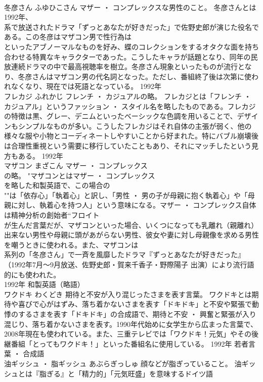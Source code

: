 \documentclass[8pt]{extreport}
\begin{document}
\begin{CJK}{UTF8}{min}
\\	冬彦さん	ふゆひこさん	マザー ・ コンプレックスな男性のこと。	冬彦さんとは1992年、
\\	系で放送されたドラマ「ずっとあなたが好きだった」で佐野史郎が演じた役名である。この冬彦はマザコン男で性行為は
\\	といったアブノーマルなものを好み、蝶のコレクションをするオタクな面を持ち合わせる特異なキャラクターであった。こうしたキャラが話題となり、同年の民放連続ドラマの中で最高視聴率を樹立。冬彦さん現象といったものが流行となり、冬彦さんはマザコン男の代名詞となった。ただし、番組終了後は次第に使われなくなり、現在では死語となっている。	1992年	
\\	フレカジ	ふれかじ	フレンチ ・ カジュアルの略。	フレカジとは「フレンチ ・ カジュアル」というファッション ・ スタイル名を略したものである。フレカジの特徴は黒、グレー、デニムといったベーシックな色調を用いることで、デザインもシンプルなものが多い。こうしたフレカジはそれ自体の主張が弱く、他の様々な服や小物とコーディネートしやすいことから好まれた。特にバブル崩壊後は合理性重視という需要に移行していたこともあり、それにマッチしたという見方もある。	1992年	
\\	マザコン	まざこん	マザー ・ コンプレックス
\\	の略。	"マザコンとはマザー ・ コンプレックス
\\	を略した和製英語で、この場合の
\\	""は「依存心」「執着心」と訳し、「男性 ・ 男の子が母親に抱く執着心」や「母親に対し、執着心を持つ人」という意味になる。マザー ・ コンプレックス自体は精神分析の創始者“フロイト
\\	が生んだ言葉だが、マザコンといった場合、いくつになっても乳離れ（親離れ）出来ない男性や母親に頭があがらない男性、彼女や妻に対し母親像を求める男性を嘲うときに使われる。また、マザコンは
\\	系列の「冬彦さん」で一斉を風靡したドラマ『ずっとあなたが好きだった』（1992年7月～9月放送、佐野史郎・賀来千香子・野際陽子 出演）により流行語的にも使われた。
\\	1992年	和製英語（略語）	
\\	ワクドキ	わくどき	期待と不安が入り混じったさまを表す言葉。	ワクドキとは期待や喜びで心がはずみ、落ち着かないさまを表す「ドキドキ」と不安や緊張で動悸のするさまを表す「ドキドキ」の合成語で、期待と不安 ・ 興奮と緊張が入り混じり、落ち着かないさまを表す。1990年代始めに女学生から広まった言葉で、2008年現在も使われている。また、三重テレビでは「ワクドキ！元気」やその後継番組「とってもワクドキ！」といった番組名に使用している。	1992年	若者言葉 ・ 合成語	
\\	油ギッシュ ・ 脂ギッシュ	あぶらぎっしゅ	顔などが脂ぎっていること。	油ギッシュとは『脂ぎる』と「精力的」「元気旺盛」を意味するドイツ語

\end{CJK}
\end{document}

